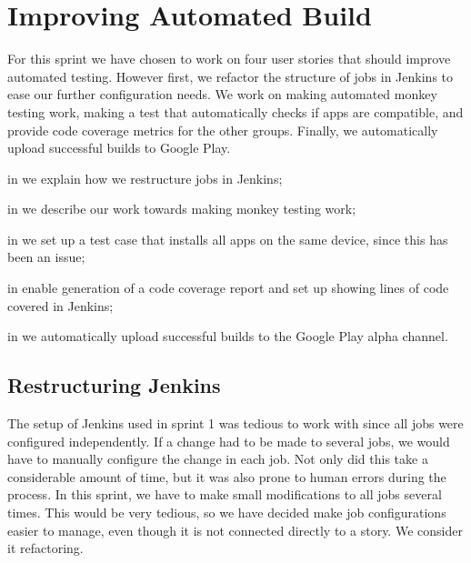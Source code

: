 \chapter{Improving Automated Build}
For this sprint we have chosen to work on four user stories that should improve automated testing. However first, we refactor the structure of jobs in Jenkins to ease our further configuration needs. We work on making automated monkey testing work, making a test that automatically checks if apps are compatible, and provide code coverage metrics for the other groups. Finally, we automatically upload successful builds to Google Play.


\begin{chapterorganization}
  \item in  we explain how we restructure jobs in Jenkins;
  \item in  we describe our work towards making monkey testing work;
  \item in  we set up a test case that installs all apps on the same device, since this has been an issue;
  \item in  enable generation of a code coverage report and set up showing lines of code covered in Jenkins;
  \item in  we automatically upload successful builds to the Google Play alpha channel.
\end{chapterorganization}

\section{Restructuring Jenkins}\label{sec:jenkins_restruct}
The setup of Jenkins used in sprint 1 was tedious to work with since all jobs were configured independently. If a change had to be made to several jobs, we would have to manually configure the change in each job. Not only did this take a considerable amount of time, but it was also prone to human errors during the process. In this sprint, we have to make small modifications to all jobs several times. This would be very tedious, so we have decided make job configurations easier to manage, even though it is not connected directly to a story. We consider it refactoring.

